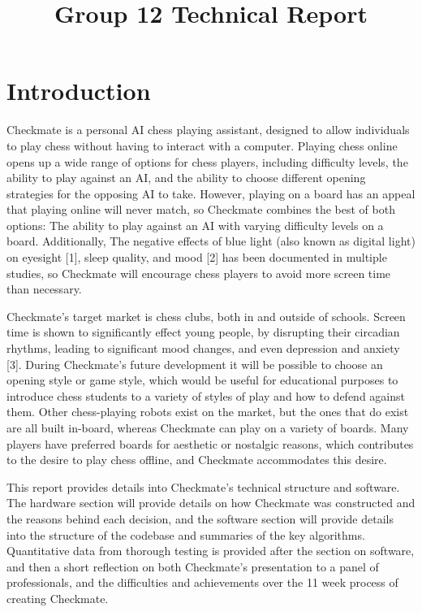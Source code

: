 \documentclass[onecolumn]{IEEEtran}
\begin{document}


\title{Group 12 Technical Report}
\maketitle

\section{Introduction}
Checkmate is a personal AI chess playing assistant, designed to allow individuals to play chess without having to interact with a computer. Playing chess online opens up a wide range of options for chess players, including difficulty levels, the ability to play against an AI, and the ability to choose different opening strategies for the opposing AI to take. However, playing on a board has an appeal that playing online will never match, so Checkmate combines the best of both options: The ability to play against an AI with varying difficulty levels on a board. Additionally, The negative effects of blue light (also known as digital light) on eyesight [1], sleep quality, and mood [2] has been documented in multiple studies, so Checkmate will encourage chess players to avoid more screen time than necessary. \par
Checkmate's target market is chess clubs, both in and outside of schools. Screen time is shown to significantly effect young people, by disrupting their circadian rhythms, leading to significant mood changes, and even depression and anxiety [3]. During Checkmate's future development it will be possible to choose an opening style or game style, which would be useful for educational purposes to introduce chess students to a variety of styles of play and how to defend against them. Other chess-playing robots exist on the market, but the ones that do exist are all built in-board, whereas Checkmate can play on a variety of boards. Many players have preferred boards for aesthetic or nostalgic reasons, which contributes to the desire to play chess offline, and Checkmate accommodates this desire. \par
This report provides details into Checkmate's technical structure and software. The hardware section will provide details on how Checkmate was constructed and the reasons behind each decision, and the software section will provide details into the structure of the codebase and summaries of the key algorithms. Quantitative data from thorough testing is provided after the section on software, and then a short reflection on both Checkmate's presentation to a panel of professionals, and the difficulties and achievements over the 11 week process of creating Checkmate. \par
\end{document}
